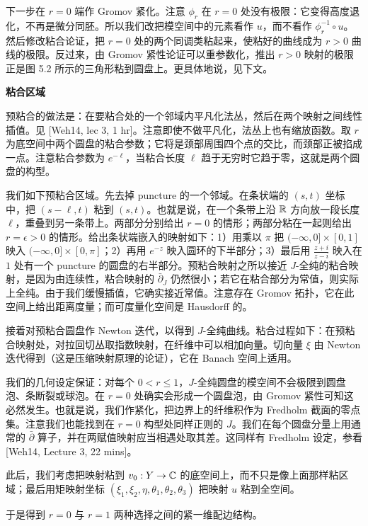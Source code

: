 下一步在 $r=0$ 端作 Gromov 紧化。注意 $\phi_r$ 在 $r=0$ 处没有极限：它变得高度退化，不再是微分同胚。所以我们改把模空间中的元素看作 $u$，而不看作 $\phi_r^{-1}\circ u$。然后修改粘合论证，把 $r=0$ 处的两个同调类粘起来，使粘好的曲线成为 $r>0$ 曲线的极限。反过来，由 Gromov 紧性论证可以重参数化，推出 $r>0$ 映射的极限正是图 5.2 所示的三角形粘到圆盘上。更具体地说，见下文。

\medskip\noindent\textbf{粘合区域}\par
预粘合的做法是：在要粘合处的一个邻域内平凡化法丛，然后在两个映射之间线性插值。见 [Weh14, lec 3, 1 hr]。注意即使不做平凡化，法丛上也有缩放函数。取 $r$ 为底空间中两个圆盘的粘合参数；它将是颈部周围四个点的交比，而颈部正被掐成一点。注意粘合参数为 $e^{-\ell}$，当粘合长度 $\ell$ 趋于无穷时它趋于零，这就是两个圆盘的构型。

我们如下预粘合区域。先去掉 puncture 的一个邻域。在条状端的 $(s,t)$ 坐标中，把 $(s-\ell,t)$ 粘到 $(s,t)$。也就是说，在一个条带上沿 $\mathbb{R}$ 方向放一段长度 $\ell$，重叠到另一条带上。两部分分别给出 $r=0$ 的情形；两部分粘在一起则给出 $r=\epsilon>0$ 的情形。给出条状端嵌入的映射如下：1）用乘以 $\pi$ 把 $(-\infty,0]\times[0,1]$ 映入 $(-\infty,0]\times[0,\pi]$；2）再用 $e^{-z}$ 映入圆环的下半部分；3）最后用 $\frac{z+i}{z-i}$ 映入在 $1$ 处有一个 puncture 的圆盘的右半部分。预粘合映射之所以接近 $J$-全纯的粘合映射，是因为由连续性，粘合映射的 $\bar\partial_J$ 仍然很小；若它在粘合部分为常值，则实际上全纯。由于我们缓慢插值，它确实接近常值。注意存在 Gromov 拓扑，它在此空间上给出距离度量；而可度量化空间是 Hausdorff 的。

接着对预粘合圆盘作 Newton 迭代，以得到 $J$-全纯曲线。粘合过程如下：在预粘合映射处，对拉回切丛取指数映射，在纤维中可以相加向量。切向量 $\xi$ 由 Newton 迭代得到（这是压缩映射原理的论证），它在 Banach 空间上适用。

我们的几何设定保证：对每个 $0<r\le1$，$J$-全纯圆盘的模空间不会极限到圆盘泡、条断裂或球泡。在 $r=0$ 处确实会形成一个圆盘泡，由 Gromov 紧性可知这必然发生。也就是说，我们作紧化，把边界上的纤维积作为 Fredholm 截面的零点集。注意我们也能找到在 $r=0$ 构型处同样正则的 $J$。我们在每个圆盘分量上用通常的 $\bar\partial$ 算子，并在两赋值映射应当相遇处取其差。这同样有 Fredholm 设定，参看 [Weh14, Lecture 3, 22 mins]。

此后，我们考虑把映射粘到 $v_0:Y\to\mathbb{C}$ 的底空间上，而不只是像上面那样粘区域；最后用矩映射坐标 $(\xi_1,\xi_2,\eta,\theta_1,\theta_2,\theta_3)$ 把映射 $u$ 粘到全空间。

于是得到 $r=0$ 与 $r=1$ 两种选择之间的紧一维配边结构。

